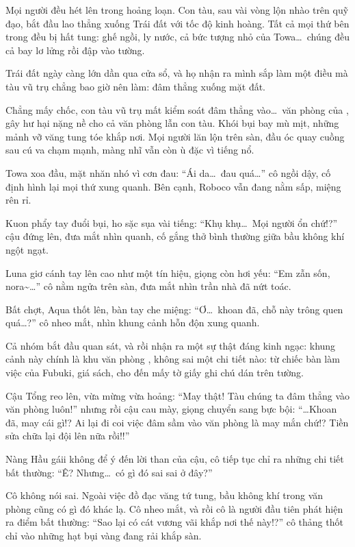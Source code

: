 \documentclass[../main.tex]{subfiles}
\begin{document}
Mọi người đều hét lên trong hoảng loạn. Con tàu, sau vài vòng lộn nhào trên quỹ đạo, bắt đầu lao thẳng xuống Trái đất với tốc độ kinh hoàng. Tất cả mọi thứ bên trong đều bị hất tung: ghế ngồi, ly nước, cả bức tượng nhỏ của Towa\dots\ chúng đều cả bay lơ lửng rồi đập vào tường.

Trái đất ngày càng lớn dần qua cửa sổ, và họ nhận ra mình sắp làm một điều mà tàu vũ trụ chẳng bao giờ nên làm: đâm thẳng xuống mặt đất.

\ct

Chẳng mấy chốc, con tàu vũ trụ mất kiểm soát đâm thẳng vào\dots\ văn phòng của \hll, gây hư hại nặng nề cho cả văn phòng lẫn con tàu. Khói bụi bay mù mịt, những mảnh vỡ văng tung tóe khắp nơi. Mọi người lăn lộn trên sàn, đầu óc quay cuồng sau cú va chạm mạnh, màng nhĩ vẫn còn ù đặc vì tiếng nổ.


Towa xoa đầu, mặt nhăn nhó vì cơn đau: ``Ái da\dots\ đau quá\dots'' cô ngồi dậy, cố định hình lại mọi thứ xung quanh. Bên cạnh, Roboco vẫn đang nằm sấp, miệng rên rỉ.

Kuon phẩy tay đuổi bụi, ho sặc sụa vài tiếng: ``Khụ khụ\dots\ Mọi người ổn chứ!?'' cậu đứng lên, đưa mắt nhìn quanh, cố gắng thở bình thường giữa bầu không khí ngột ngạt.

Luna giơ cánh tay lên cao như một tín hiệu, giọng còn hơi yếu: ``Em zẫn sốn, nora\~{}\dots'' cô nằm ngửa trên sàn, đưa mắt nhìn trần nhà đã nứt toác.

Bất chợt, Aqua thốt lên, bàn tay che miệng: ``Ơ\dots\ khoan đã, chỗ này trông quen quá\dots?'' cô nheo mắt, nhìn khung cảnh hỗn độn xung quanh.

Cả nhóm bắt đầu quan sát, và rồi nhận ra một sự thật đáng kinh ngạc: khung cảnh này chính là khu văn phòng \hll, không sai một chi tiết nào: từ chiếc bàn làm việc của Fubuki, giá sách, cho đến mấy tờ giấy ghi chú dán trên tường.

Cậu Tổng reo lên, vừa mừng vừa hoảng: ``May thật! Tàu chúng ta đâm thẳng vào văn phòng luôn!'' nhưng rồi cậu cau mày, giọng chuyển sang bực bội: ``\dots Khoan đã, may cái gì!? Ai lại đi coi việc đâm sầm vào văn phòng là may mắn chứ!? Tiền sửa chữa lại đội lên nữa rồi!!''

Nàng Hầu gáii không để ý đến lời than của cậu, cô tiếp tục chỉ ra những chi tiết bất thường: ``Ê? Nhưng\dots\ có gì đó sai sai ở đây?''

Cô không nói sai. Ngoài việc đồ đạc văng tứ tung, bầu không khí trong văn phòng cũng có gì đó khác lạ. Cô nheo mắt, và rồi cô là người đầu tiên phát hiện ra điểm bất thường: ``Sao lại có cát vương vãi khắp nơi thế này!?'' cô thảng thốt chỉ vào những hạt bụi vàng đang rải khắp sàn.
\end{document}
